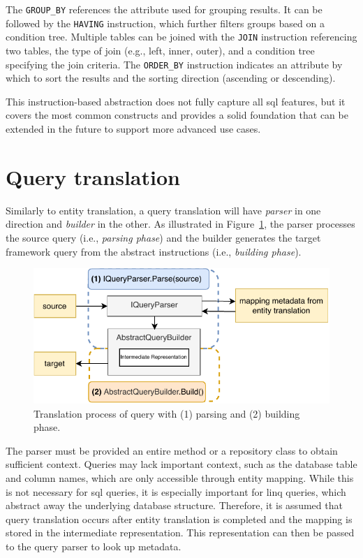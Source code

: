 The \texttt{GROUP\_BY} references the attribute used for grouping results. It can be followed by the \texttt{HAVING} instruction, which further filters groups based on a condition tree. 
Multiple tables can be joined with the \texttt{JOIN} instruction referencing two tables, the type of join (e.g., left, inner, outer), and a condition tree specifying the join criteria. 
The \texttt{ORDER\_BY} instruction indicates an attribute by which to sort the results and the sorting direction (ascending or descending).

This instruction-based abstraction does not fully capture all \acrshort{sql} features, but it covers the most common constructs and provides a solid foundation that can be extended in the future to support more advanced use cases.

\section{Query translation}
Similarly to entity translation, a query translation will have \textit{parser} in one direction and \textit{builder} in the other. As illustrated in Figure~\ref{fig:translation_process_query}, the parser processes the source query (i.e., \textit{parsing phase}) and the builder generates the target framework query from the abstract instructions (i.e., \textit{building phase}).

\begin{figure}[h]
  \centering
  \includegraphics[scale=1]{thesis/img/thesis/04_translate_process_queries.drawio.pdf}
  \caption{Translation process of query with (1) parsing and (2) building phase.}
  \label{fig:translation_process_query}
\end{figure}

The parser must be provided an entire method or a repository class to obtain sufficient context. Queries may lack important context, such as the database table and column names, which are only accessible through entity mapping. While this is not necessary for \acrshort{sql} queries, it is especially important for \acrshort{linq} queries, which abstract away the underlying database structure. Therefore, it is assumed that query translation occurs after entity translation is completed and the mapping is stored in the intermediate representation. This representation can then be passed to the query parser to look up metadata.

